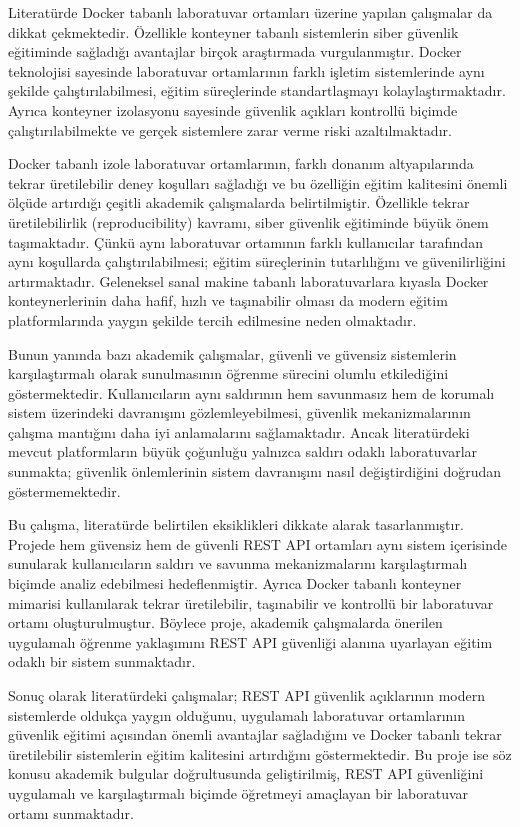 Literatürde Docker tabanlı laboratuvar ortamları üzerine yapılan çalışmalar da dikkat çekmektedir. Özellikle konteyner tabanlı sistemlerin siber güvenlik eğitiminde sağladığı avantajlar birçok araştırmada vurgulanmıştır. Docker teknolojisi sayesinde laboratuvar ortamlarının farklı işletim sistemlerinde aynı şekilde çalıştırılabilmesi, eğitim süreçlerinde standartlaşmayı kolaylaştırmaktadır. Ayrıca konteyner izolasyonu sayesinde güvenlik açıkları kontrollü biçimde çalıştırılabilmekte ve gerçek sistemlere zarar verme riski azaltılmaktadır.

Docker tabanlı izole laboratuvar ortamlarının, farklı donanım altyapılarında tekrar üretilebilir deney koşulları sağladığı ve bu özelliğin eğitim kalitesini önemli ölçüde artırdığı çeşitli akademik çalışmalarda belirtilmiştir. Özellikle tekrar üretilebilirlik (reproducibility) kavramı, siber güvenlik eğitiminde büyük önem taşımaktadır. Çünkü aynı laboratuvar ortamının farklı kullanıcılar tarafından aynı koşullarda çalıştırılabilmesi; eğitim süreçlerinin tutarlılığını ve güvenilirliğini artırmaktadır. Geleneksel sanal makine tabanlı laboratuvarlara kıyasla Docker konteynerlerinin daha hafif, hızlı ve taşınabilir olması da modern eğitim platformlarında yaygın şekilde tercih edilmesine neden olmaktadır.

Bunun yanında bazı akademik çalışmalar, güvenli ve güvensiz sistemlerin karşılaştırmalı olarak sunulmasının öğrenme sürecini olumlu etkilediğini göstermektedir. Kullanıcıların aynı saldırının hem savunmasız hem de korumalı sistem üzerindeki davranışını gözlemleyebilmesi, güvenlik mekanizmalarının çalışma mantığını daha iyi anlamalarını sağlamaktadır. Ancak literatürdeki mevcut platformların büyük çoğunluğu yalnızca saldırı odaklı laboratuvarlar sunmakta; güvenlik önlemlerinin sistem davranışını nasıl değiştirdiğini doğrudan göstermemektedir.

Bu çalışma, literatürde belirtilen eksiklikleri dikkate alarak tasarlanmıştır. Projede hem güvensiz hem de güvenli REST API ortamları aynı sistem içerisinde sunularak kullanıcıların saldırı ve savunma mekanizmalarını karşılaştırmalı biçimde analiz edebilmesi hedeflenmiştir. Ayrıca Docker tabanlı konteyner mimarisi kullanılarak tekrar üretilebilir, taşınabilir ve kontrollü bir laboratuvar ortamı oluşturulmuştur. Böylece proje, akademik çalışmalarda önerilen uygulamalı öğrenme yaklaşımını REST API güvenliği alanına uyarlayan eğitim odaklı bir sistem sunmaktadır.

Sonuç olarak literatürdeki çalışmalar; REST API güvenlik açıklarının modern sistemlerde oldukça yaygın olduğunu, uygulamalı laboratuvar ortamlarının güvenlik eğitimi açısından önemli avantajlar sağladığını ve Docker tabanlı tekrar üretilebilir sistemlerin eğitim kalitesini artırdığını göstermektedir. Bu proje ise söz konusu akademik bulgular doğrultusunda geliştirilmiş, REST API güvenliğini uygulamalı ve karşılaştırmalı biçimde öğretmeyi amaçlayan bir laboratuvar ortamı sunmaktadır.

